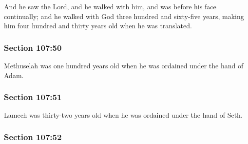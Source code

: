 		And he saw the Lord, and he walked with him, and was before his face continually; and he walked with God three hundred and sixty-five years, making him four hundred and thirty years old when he was translated.


	\subsubsection{Section 107:50} %
		\label{DC107-50}

		Methuselah was one hundred years old when he was ordained under the hand of Adam.


	\subsubsection{Section 107:51} %
		\label{DC107-51}

		Lamech was thirty-two years old when he was ordained under the hand of Seth.


	\subsubsection{Section 107:52} %
		\label{DC107-52}

